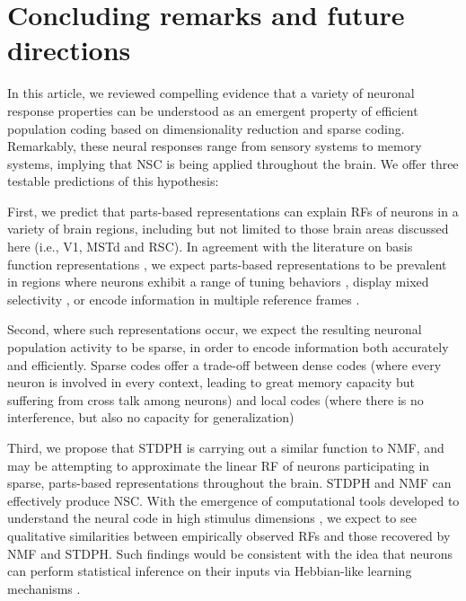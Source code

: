 \section*{Concluding remarks and future directions}
\label{sec:conclusion}

In this article, we reviewed compelling evidence that a variety of neuronal response properties can be understood as an emergent property of efficient population coding based on dimensionality reduction and sparse coding. Remarkably, these neural responses range from sensory systems to memory systems, implying that \ac{NSC} is being applied throughout the brain. We offer three testable predictions of this hypothesis:

First, we predict that parts-based representations can explain
\acp{RF} of neurons in a variety of brain regions,
including but not limited to those brain areas discussed here (i.e., V1, MSTd and RSC). In agreement with the literature on basis function representations
\cite{PougetSejnowski1997,PougetSnyder2000,Poggio1990},
we expect parts-based representations
to be prevalent in regions where neurons
exhibit a range of tuning behaviors \cite{Beyeler2016},
display mixed selectivity \cite{Fusi2016,Eichenbaum2017},
or encode information in multiple reference frames \cite{AlexanderNitz2015,Rounds2016}.

Second, where such representations occur, we expect the resulting
neuronal population activity to be sparse,
in order to encode information both accurately and efficiently.
Sparse codes offer a trade-off between 
dense codes (where every neuron is involved in every context,
leading to great memory capacity but suffering from cross talk among neurons)
and local codes (where there is no interference, 
but also no capacity for generalization) %

Third, we propose that \ac{STDPH} is carrying out a similar function to \ac{NMF},
and may be attempting to approximate the linear \ac{RF} of
neurons participating in sparse, parts-based representations
throughout the brain. STDPH and NMF can effectively produce NSC.
With the emergence of computational tools developed
to understand the neural code 
in high stimulus dimensions \cite{PillowSimoncelli2006},
we expect to see qualitative similarities between empirically observed
\acp{RF} and those recovered by \ac{NMF} and \ac{STDPH}.
Such findings would be consistent with the idea that neurons
can perform statistical inference on their inputs via
Hebbian-like learning mechanisms
\cite{Nessler2009,Carlson2013,MorenoBoteDrugowitsch2015,Oja1982}.

